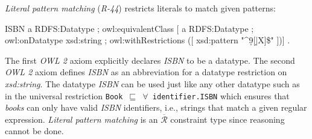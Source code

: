 \documentclass{acm_proc_article-sp}
\newcommand{\ms}[1]{%
  \texttt{#1}
}
\newcommand{\tb}[1]{\todo[size=\small, color=green!40]{\textbf{Thomas:} #1}}
\newcommand{\er}[1]{\todo[size=\small, color=red!40]{\textbf{Erman:} #1}}
\begin{document}
{\em Literal pattern matching} (\emph{R-44}) restricts literals to match given patterns:
\begin{ex}
ISBN a RDFS:Datatype ; owl:equivalentClass [ a RDFS:Datatype ;
    owl:onDatatype xsd:string ; 
    owl:withRestrictions ([ xsd:pattern "^\d{9}[\d|X]\$" ])] .
\end{ex}

The first \emph{OWL 2} axiom explicitly declares {\em ISBN} to be a datatype. %
The second \emph{OWL 2} axiom defines {\em ISBN} as an abbreviation for a datatype restriction on {\em xsd:string}. 
The datatype {\em ISBN} can be used just like any other datatype such as in
the universal restriction {\small\ms{Book $\sqsubseteq$ $\forall$ identifier.ISBN}} which ensures that \emph{books} can only have valid \emph{ISBN} identifiers, 
i.e., strings that match a given regular expression. 
{\em Literal pattern matching} is an $\overline{\mathcal{R}}$ constraint type since reasoning cannot be done.
\end{document}
